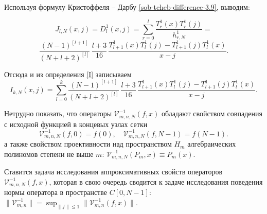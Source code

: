Используя формулу Кристоффеля -- Дарбу \eqref{sob-tcheb-difference-3.9}, выводим:

\begin{equation*}
  J_{l,N} (x,j) = D^{1}_{l} (x,j) =
  \sum_{r=0}^{l} \frac{T^{1}_{r}(x) T^{1}_{r}(j)}{h^{1}_{r,N}} =
\end{equation*}
\begin{equation}\label{krist}
  \frac{(N-1)^{[l+1]}}{(N+l+2)^{[l]}} \, \frac{l+3}{16}\,
  \frac{T_{l+1}^1(x) T_{l}^1(j) - T_{l+1}^1(j) T_{l}^1(x)}{x-j}.
\end{equation}

Отсюда и из определения \eqref{I} записываем%
\begin{equation*}
  I_{k,N}(x,j) = %
  \sum_{l=0}^{k} \frac{(N-1)^{[l+1]}}{(N+l+2)^{[l]}}\,\frac{l+3}{16}\,
  \frac{T_{l+1}^1(x) T_{l}^1(j) - T_{l+1}^1(j) T_{l}^1(x)}{x-j}.
\end{equation*}



Нетрудно показать, что операторы $\mathcal{V}_{m,n,N}^{-1}(f,x)$ обладают свойством совпадения с исходной функцией в концевых узлах сетки
$$
\mathcal{V}_{m,n,N}^{-1}(f,0)= f(0), \quad \mathcal{V}_{m,n,N}^{-1}(f,N-1)= f(N-1).
$$
а также свойством проективности над пространством $H_{m}$ алгебраических полиномов степени не выше $m$: $\mathcal{V}_{m,n,N}^{-1}(P_m,x)\equiv P_m(x)$.

Ставится задача исследования аппроксимативных свойств операторов $\mathcal{V}_{m,n,N}^{-1}(f,x)$, которая в свою очередь сводится к задаче исследования поведения нормы оператора в пространстве $C[0, N-1]$:
$\| \mathcal{V}^{-1}_{m,n} \| = \sup_{\| f \| \leq 1} \| \mathcal{V}^{-1}_{m,n}(f,x) \|$.

%
%

